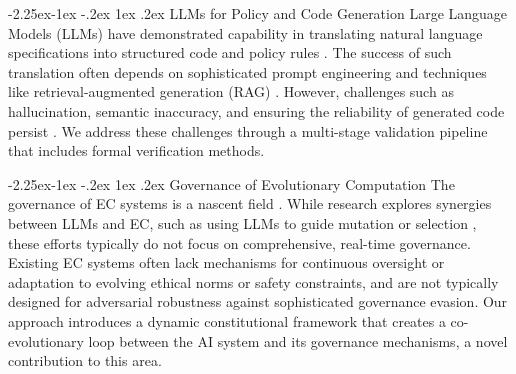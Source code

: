 \documentclass[manuscript,screen,review,anonymous,9pt]{acmart}
\makeatletter
\renewcommand\subsection{\@startsection{subsection}{2}{\z@}%
  {-2.25ex\@plus -1ex \@minus -.2ex}%
  {1ex \@plus .2ex}%
  {\normalfont\large\bfseries}}
\makeatother
\begin{document}
\subsection{LLMs for Policy and Code Generation}
\label{subsec:related_llm_synthesis}
Large Language Models (LLMs) have demonstrated capability in translating natural language specifications into structured code and policy rules \cite{Almulla2024EmergenceLLMPolicy, ResearchGate2025AutoPAC, Li2025VeriCoder}. The success of such translation often depends on sophisticated prompt engineering and techniques like retrieval-augmented generation (RAG) \cite{AnalyticsVidhya2024PromptingTechniques, arXiv2025FutureWorkRAG}. However, challenges such as hallucination, semantic inaccuracy, and ensuring the reliability of generated code persist \cite{AAAI2025CodeHalu, Taeihagh2025Governing}. We address these challenges through a multi-stage validation pipeline that includes formal verification methods.

\subsection{Governance of Evolutionary Computation}
\label{subsec:related_ec_governance}
The governance of EC systems is a nascent field \cite{Chauhan2025ECLLMSurvey}. While research explores synergies between LLMs and EC, such as using LLMs to guide mutation or selection \cite{Nordin2024LLMGP}, these efforts typically do not focus on comprehensive, real-time governance. Existing EC systems often lack mechanisms for continuous oversight or adaptation to evolving ethical norms or safety constraints, and are not typically designed for adversarial robustness against sophisticated governance evasion. Our approach introduces a dynamic constitutional framework that creates a co-evolutionary loop between the AI system and its governance mechanisms, a novel contribution to this area.
\end{document}
